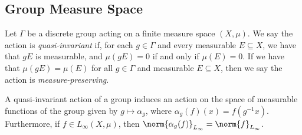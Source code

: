 \documentclass[10pt]{mypackage}
\begin{document}
\subsection{Group Measure Space}%
Let $\Gamma$ be a discrete group acting on a finite measure space $\left( X,\mu \right)$. We say the action is \textit{quasi-invariant} if, for each $g\in \Gamma$ and every measurable $E\subseteq X$, we have that $gE$ is measurable, and $\mu\left( gE \right) = 0$ if and only if $\mu\left( E \right) = 0$. If we have that $\mu\left( gE \right) = \mu\left( E \right)$ for all $g\in \Gamma$ and measurable $E\subseteq X$, then we say the action is \textit{measure-preserving}.

A quasi-invariant action of a group induces an action on the space of measurable functions of the group given by $g\mapsto \alpha_g$, where $\alpha_g(f)(x) = f\left( g^{-1}x \right)$. Furthermore, if $f\in L_{\infty}\left( X,\mu \right)$, then $\norm{\alpha_g(f)}_{L_{\infty}}=\norm{f}_{L_{\infty}}$.
\end{document}
